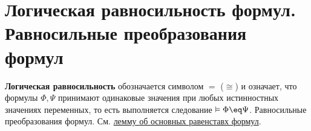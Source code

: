 \section{Логическая равносильность формул. Равносильные преобразования формул}
\dftion \textbf{Логическая равносильность} обозначается символом $=$ ($\cong$) и означает, что формулы $\Phi, \Psi$ принимают одинаковые значения при любых истинностных значениях переменных, то есть выполняется следование $\vDash \Phi \eq \Psi$.
Равносильные преобразования формул. См. \hyperref[q2:lemma]{лемму об основных равенставх формул}.